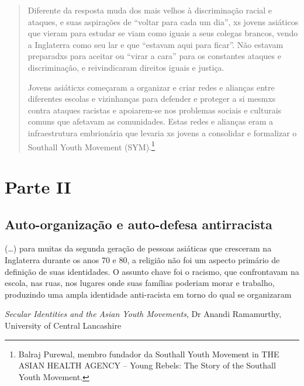 \begin{quote}
Diferente da resposta muda dos mais velhos à discriminação racial e ataques, e suas aspirações de “voltar para cada um dia”, xs jovens asiáticos que vieram para estudar se viam como iguais a seus colegas brancos, vendo a Inglaterra como seu lar e que “estavam aqui para ficar”. Não estavam preparadxs para aceitar ou “virar a cara” para os constantes ataques e discriminação, e reivindicaram direitos iguais e justiça.

Jovens asiáticxs começaram a organizar e criar redes e alianças entre diferentes escolas e vizinhanças para defender e proteger a si mesmxs contra ataques racistas e apoiarem-se nos problemas sociais e culturais comuns que afetavam as comunidades. Estas redes e alianças eram a infraestrutura embrionária que levaria xs jovens a consolidar e formalizar o Southall Youth Movement (SYM).\footnote{Balraj Purewal, membro fundador da Southall Youth Movement in THE ASIAN HEALTH AGENCY – Young Rebels: The Story of the Southall Youth Movement.}
\end{quote}



\section{Parte II}

\subsection{Auto-organização e auto-defesa antirracista}

\epigraph{(…) para muitas da segunda geração de pessoas asiáticas que cresceram na Inglaterra durante os anos 70 e 80, a religião não foi um aspecto primário de definição de suas identidades. O assunto chave foi o racismo, que confrontavam na escola, nas ruas, nos lugares onde suas famílias poderiam morar e trabalho, produzindo uma ampla identidade anti-racista em torno do qual se organizaram}{\textit{Secular Identities and the Asian Youth Movements}, Dr Anandi Ramamurthy, University of Central Lancashire}

